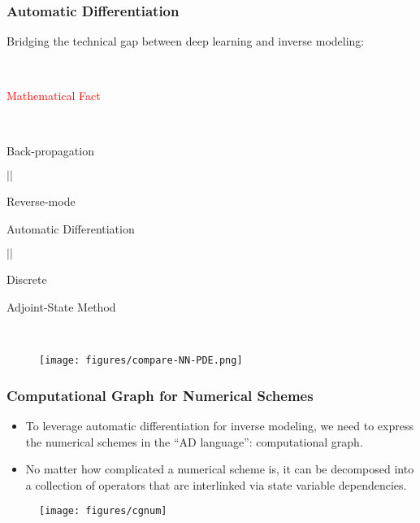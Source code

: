 \documentclass[usenames,dvipsnames]{beamer}
\begin{document}
\begin{frame}
	\frametitle{Automatic Differentiation}
	Bridging the technical gap between deep learning and inverse modeling: 
	
	
	\begin{minipage}[t]{0.4\textwidth}
		
		\
		
		
		
		\begin{center}
			\textcolor{red}{Mathematical Fact}
			
			\
			
			Back-propagation 
			
			$||$
			
			Reverse-mode
			
			Automatic Differentiation 
			
			$||$
			
			Discrete 
			
			Adjoint-State Method
		\end{center}
	\end{minipage}~
	\begin{minipage}[t]{0.6\textwidth}
		\begin{figure}[hbt]
			\texttt{[image: figures/compare-NN-PDE.png]}
		\end{figure}
	\end{minipage}
	
\end{frame}

\begin{frame}
	\frametitle{Computational Graph for Numerical Schemes}
	
	\begin{itemize}
		\item To leverage automatic differentiation for inverse modeling, we need to express the numerical schemes in the ``AD language'': computational graph. 
		\item No matter how complicated a numerical scheme is, it can be decomposed into a collection of operators that are interlinked via state variable dependencies. 
	\end{itemize}
	
	\begin{figure}[hbt]
		\texttt{[image: figures/cgnum]}
	\end{figure}
	
	
	
\end{frame}
\end{document}
